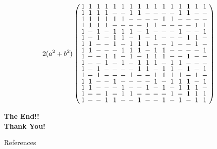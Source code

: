 \documentclass{beamer}
\begin{document}
\begin{frame}
  
  \[
    2(a^2+b^2)
    \arraycolsep=2.0pt\def\arraystretch{0.75}
    \left(
      \begin{array}{cccccccccccccccc}
        1&1&1&1&1&1&1&1&1&1&1&1&1&1&1&1\\
        1&1&1&1&-&-&1&1&-&-&-&-&1&1&-&-\\
        1&1&1&1&1&1&-&-&-&-&1&1&-&-&-&-\\
        1&1&1&1&-&-&-&-&1&1&-&-&-&-&1&1\\
        1&-&1&-&1&1&1&-&1&-&-&-&1&-&-&1\\
        1&-&1&-&1&1&-&1&-&1&-&-&-&1&1&-\\
        1&1&-&-&1&-&1&1&1&-&-&1&-&-&1&-\\
        1&1&-&-&-&1&1&1&-&1&1&-&-&-&-&1\\
        1&-&-&1&1&-&1&-&1&1&1&-&-&1&-&-\\
        1&-&-&1&-&1&-&1&1&1&-&1&1&-&-&-\\
        1&-&1&-&-&-&-&1&1&-&1&1&-&1&-&1\\
        1&-&1&-&-&-&1&-&-&1&1&1&1&-&1&-\\
        1&1&-&-&1&-&-&-&-&1&-&1&1&1&-&1\\
        1&1&-&-&-&1&-&-&1&-&1&-&1&1&1&-\\
        1&-&-&1&-&1&1&-&-&-&-&1&-&1&1&1\\
        1&-&-&1&1&-&-&1&-&-&1&-&1&-&1&1\\
      \end{array}
    \right)
  \]

\end{frame}


\begin{frame}

  \begin{center}
    {\huge\bf The End!!}\\
    
    {\bf Thank You!}
  \end{center}

\end{frame}

\begin{frame}{References}
  
  
\end{frame}
\end{document}

